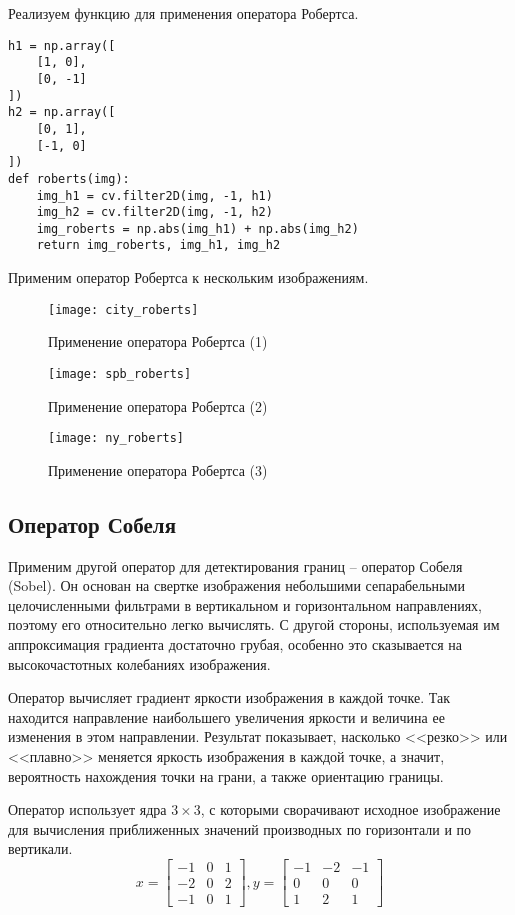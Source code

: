 {Реализуем функцию для применения оператора Робертса.

\begin{lstlisting}[caption={Фунукция для применения оператора Робертса}]
h1 = np.array([
    [1, 0],
    [0, -1]
])
h2 = np.array([
    [0, 1],
    [-1, 0]
])
def roberts(img):
    img_h1 = cv.filter2D(img, -1, h1)
    img_h2 = cv.filter2D(img, -1, h2)
    img_roberts = np.abs(img_h1) + np.abs(img_h2)
    return img_roberts, img_h1, img_h2
\end{lstlisting}

Применим оператор Робертса к нескольким изображениям.

\begin{figure}[H]
	\centering
	\texttt{[image: city\_roberts]}
	\caption{Применение оператора Робертса (1)}
\end{figure}

\begin{figure}[H]
	\centering
	\texttt{[image: spb\_roberts]}
	\caption{Применение оператора Робертса (2)}
\end{figure}

\begin{figure}[H]
	\centering
	\texttt{[image: ny\_roberts]}
	\caption{Применение оператора Робертса (3)}
\end{figure}

\subsection{Оператор Собеля}

Применим другой оператор для детектирования границ -- оператор Собеля (Sobel). Он основан на свертке изображения небольшими сепарабельными целочисленными фильтрами в вертикальном и горизонтальном направлениях, поэтому его относительно легко вычислять. С другой стороны, используемая им аппроксимация градиента достаточно грубая, особенно это сказывается на высокочастотных колебаниях изображения.

Оператор вычисляет градиент яркости изображения в каждой точке. Так находится направление наибольшего увеличения яркости и величина ее изменения в этом направлении. Результат показывает, насколько <<резко>> или <<плавно>> меняется яркость изображения в каждой точке, а значит, вероятность нахождения точки на грани, а также ориентацию границы.

Оператор использует ядра $3 \times 3$, с которыми сворачивают исходное изображение для вычисления приближенных значений производных по горизонтали и по вертикали.
$$
x = \begin{bmatrix}
-1 & 0 & 1 \\
-2 & 0 & 2 \\
-1 & 0 & 1
\end{bmatrix},
y = \begin{bmatrix}
-1 & -2 & -1 \\
0  & 0  & 0 \\
1  & 2  & 1
\end{bmatrix}
$$

}
